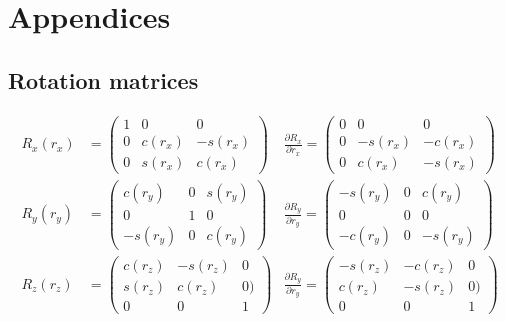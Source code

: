 \documentclass[10pt]{article}         %
\begin{document}
\section{Appendices}
\subsection{Rotation matrices}
\label{sec: rotation matrices}
\begin{align*}
R_x(r_x) &= 
\begin{pmatrix}
1& 0& 0\\
0& c(r_x)& -s(r_x)\\
0& s(r_x)& c(r_x)
\end{pmatrix} &\frac{\partial R_x}{\partial r_x} = \begin{pmatrix}
0& 0& 0\\
0& -s(r_x)& -c(r_x)\\
0& c(r_x)& -s(r_x)
\end{pmatrix}\\
R_y(r_y) &= \begin{pmatrix}
c(r_y)& 0& s(r_y)\\
0& 1& 0\\
-s(r_y)& 0& c(r_y)
\end{pmatrix} &\frac{\partial R_y}{\partial r_y} = \begin{pmatrix}
-s(r_y)& 0& c(r_y)\\
0& 0& 0\\
-c(r_y)& 0& -s(r_y)
\end{pmatrix}\\
R_z(r_z) &= \begin{pmatrix}
c(r_z)& -s(r_z)& 0\\
s(r_z)& c(r_z)& 0)\\
0& 0& 1
\end{pmatrix} &\frac{\partial R_y}{\partial r_y} = \begin{pmatrix}
-s(r_z)& -c(r_z)& 0\\
c(r_z)& -s(r_z)& 0)\\
0& 0& 1
\end{pmatrix}
\end{align*}
\end{document}
